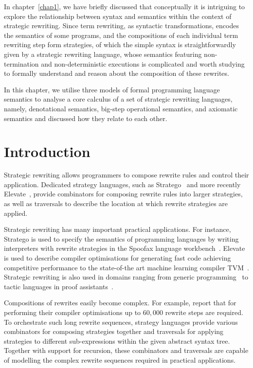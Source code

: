 In chapter~\ref{chap1}, we have briefly discussed that conceptually it is intriguing to explore the relationship between syntax and semantics within the context of strategic rewriting. Since term rewriting, as syntactic transformations, encodes the semantics of some programs, and the compositions of each individual term rewriting step form strategies, of which the simple syntax is straightforwardly given by a strategic rewriting language, whose semantics featuring non-termination and non-deterministic executions is complicated and worth studying to formally understand and reason about the composition of these rewrites.

In this chapter, we utilise three models of formal programming language semantics to analyse a core calculus of a set of strategic rewriting languages, namely, denotational semantics, big-step operational semantics, and axiomatic semantics and discussed how they relate to each other.

\section{Introduction}
\label{chap4:introduction}
Strategic rewriting allows programmers to compose rewrite rules and control their application.
Dedicated strategy languages, such as Stratego~\citep{DBLP:conf/icfp/VisserBT98,10.1007/3-540-45127-7_27} and more recently Elevate~\citep{DBLP:journals/cacm/HagedornLKQGS23,DBLP:journals/pacmpl/HagedornLKQGS20}, provide combinators for composing rewrite rules into larger strategies, as well as traversals to describe the location at which rewrite strategies are applied.

Strategic rewriting has many important practical applications. For instance, Stratego is used to specify the semantics of programming languages by writing interpreters with rewrite strategies in the Spoofax language workbench~\citep{DBLP:journals/software/WachsmuthKV14}.
Elevate is used to describe compiler optimisations for generating fast code achieving competitive performance to the state-of-the art machine learning compiler TVM~\citep{DBLP:journals/pacmpl/HagedornLKQGS20}. Strategic rewriting is also used in domains ranging from generic programming~\citep{DBLP:conf/rule/LammelV02} to tactic languages in proof assistants~\citep{sozeau2014proof}.

Compositions of rewrites easily become complex.
For example, \citet{DBLP:journals/pacmpl/HagedornLKQGS20} report that for performing their compiler optimisations up to $60,000$ rewrite steps are required. To orchestrate such long rewrite sequences, strategy languages provide various combinators for composing strategies together and traversals for applying strategies to different sub-expressions within the given abstract syntax tree.
Together with support for recursion, these combinators and traversals are capable of modelling the complex rewrite sequences required in practical applications.

